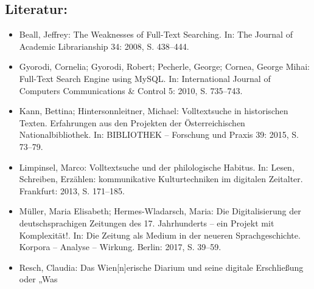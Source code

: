 \documentclass{article}
\begin{document}
        \subsection*{Literatur:}\begin{itemize}\item Beall, Jeffrey: The Weaknesses of Full-Text Searching. In: The Journal of Academic Librarianship 34: 2008, S. 438–444.\item Gyorodi, Cornelia; Gyorodi, Robert; Pecherle, George; Cornea, George Mihai: Full-Text Search Engine using MySQL. In: International Journal of Computers Communications & Control 5: 2010, S. 735–743.\item Kann, Bettina; Hintersonnleitner, Michael: Volltextsuche in historischen Texten. Erfahrungen aus den Projekten der Österreichischen Nationalbibliothek. In: BIBLIOTHEK – Forschung und Praxis 39: 2015, S. 73–79.\item Limpinsel, Marco: Volltextsuche und der philologische Habitus. In: Lesen, Schreiben, Erzählen: kommunikative Kulturtechniken im digitalen Zeitalter. Frankfurt: 2013, S. 171–185.\item Müller, Maria Elisabeth; Hermes-Wladarsch, Maria: Die Digitalisierung der deutschsprachigen Zeitungen des 17. Jahrhunderts – ein Projekt mit Komplexität!. In: Die Zeitung als Medium in der neueren Sprachgeschichte. Korpora – Analyse – Wirkung. Berlin: 2017, S. 39–59.\item Resch, Claudia: Das Wien[n]erische Diarium und seine digitale Erschließung oder „Was

\end{itemize}
\end{document}
